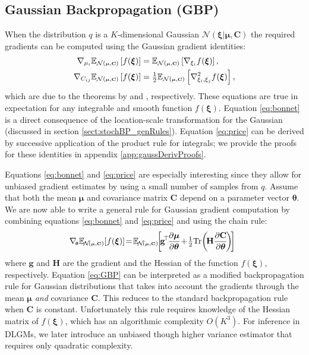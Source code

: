 \documentclass{article}
\newcommand{\E}{\mathbb{E}} %
\DeclareMathOperator{\Tr}{Tr} %
\newcommand{\N}{\mathcal{N}} %
\newcommand{\myvec}[1]{\mbox{$\mathbf{#1}$}}
\newcommand{\myvecsym}[1]{\mbox{$\boldsymbol{#1}$}}
\newcommand{\vmu}{\mbox{$\myvecsym{\mu}$}}
\newcommand{\vtheta}{\mbox{$\myvecsym{\theta}$}}
\newcommand{\vxi}{\mbox{$\myvecsym{\xi}$}}
\newcommand{\vg}{\mbox{$\myvec{g}$}}
\newcommand{\vC}{\mbox{$\myvec{C}$}}
\newcommand{\vH}{\mbox{$\myvec{H}$}}
\begin{document}
\begin{bibunit}[icml2013]
\subsection{Gaussian Backpropagation (GBP)}
When the distribution $q$ is a
$K$-dimensional Gaussian $\N(\vxi | \vmu, \vC)$  
the required gradients can be computed 
using the Gaussian gradient identities:
\vspace{-1mm}
\begin{align}
\nabla_{\mu_i} \E_{ \tiny{\N(\vmu,\vC)} } \left[ f(\vxi) \right ] &= \E_{ 
\tiny{\N(\vmu,\vC)} } \left[
\nabla_{\xi_i} f(\vxi) \right], \label{eq:bonnet} \\
\nabla_{C_{ij}} \E_{ \tiny{\N(\vmu,\vC) } }\left [ f(\vxi) \right ] &= \tfrac{1}{2}  \E_{ 
\tiny{\N(\vmu,\vC)} } \left [ 
\nabla^2_{\xi_i,\xi_j} f(\vxi) \right], \label{eq:price}
\end{align}
which are due to the theorems by \citet{bonnet1964} and  \citet{price1958}, 
respectively. These equations are true in expectation 
 for any integrable and smooth function $f(\vxi)$. Equation 
\eqref{eq:bonnet} is a direct consequence of the location-scale 
transformation for the Gaussian (discussed in section 
\ref{sect:stochBP_genRules}). Equation \eqref{eq:price} can be derived by 
successive application of the product rule for integrals; we provide the proofs 
for these identities in appendix \ref{app:gaussDerivProofs}. 

Equations \eqref{eq:bonnet} and \eqref{eq:price} are especially interesting 
since they allow for unbiased gradient estimates by using a 
small number of samples from $q$. 
Assume that both the mean $\vmu$ and covariance matrix $\vC$ depend on 
a parameter vector $\vtheta$. We are now able to write a general rule for 
Gaussian gradient computation by combining equations \eqref{eq:bonnet} 
and \eqref{eq:price} and using the 
chain rule:
\vspace{-1mm}
\begin{equation}
\!\!\!\nabla_{\!\tiny{\vtheta}}\E_{\! \tiny{\N\!\left(\vmu, \vC\right)} }\! \left [ f(\vxi) \right ] \!=\! 
\E_{\! \tiny{\N\!\left(\vmu, \vC\right)} } \!\!\left [\! \mathbf{g}\!^\top\! \frac{\partial 
\vmu}{\partial \vtheta}\! +\! \tfrac{1}{2}\! \Tr\! \left(\!\mathbf{H} 
\frac{\partial \vC}{\partial \vtheta} \!\right) \!\right ] \label{eq:GBP}
\end{equation}
where $\vg$ and $\vH$ are the gradient and the Hessian of the function 
$f(\vxi)$, respectively. Equation \eqref{eq:GBP} can be interpreted as a modified 
backpropagation rule for Gaussian distributions that takes into account 
the gradients through the mean $\vmu$ \textit{and} covariance $\vC$. This  
reduces to the 
standard backpropagation rule when $\vC$ is constant. Unfortunately this 
rule requires knowledge of the Hessian 
matrix of $f(\vxi)$, which has an algorithmic complexity $O(K^3)$. For inference in DLGMs, we later introduce an unbiased though higher 
variance estimator that requires only quadratic complexity.
\vspace{-3mm}

\end{bibunit}
\end{document}

